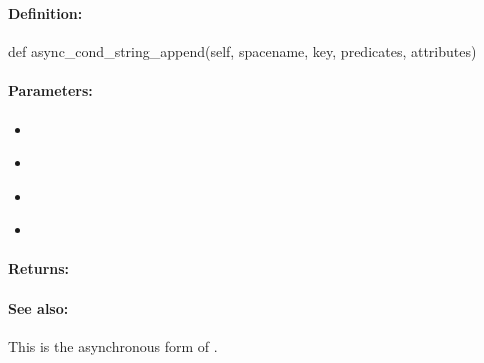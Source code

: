 \pagebreak
\subsubsection{}
\label{api:python:async_cond_string_append}


\paragraph{Definition:}
\begin{pythoncode}
def async_cond_string_append(self, spacename, key, predicates, attributes)
\end{pythoncode}

\paragraph{Parameters:}
\begin{itemize}[noitemsep]
\item {}\\

\item {}\\

\item {}\\

\item {}\\

\end{itemize}

\paragraph{Returns:}


\paragraph{See also:}  This is the asynchronous form of .

\pagebreak
\subsubsection{}
\label{api:python:list_lpush}


